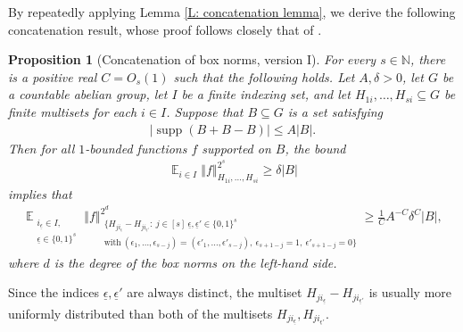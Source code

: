 \documentclass[11pt]{amsart}
\newtheorem{proposition}[lemma]{Proposition}
\theoremstyle{definition}
\DeclareMathOperator*{\E}{\mathbb{E}}
\newcommand{\ueps}{{\underline{\epsilon}}}
\DeclareMathOperator{\supp}{supp}
\newcommand{\norm}[1]{\left\Vert #1\right\Vert}
\begin{document}
By repeatedly applying Lemma \ref{L: concatenation lemma}, we derive the following concatenation result, whose proof follows closely that of \cite[Proposition 2.3]{Kuc23}.
\begin{proposition}[Concatenation of box norms, version I]\label{P: concatenation for general groups}
For every $s\in \mathbb{N}$, there is a positive real $C=O_s(1)$ such that the following holds.     Let $A, \delta>0$,
    let $G$ be a countable abelian group, let $I$ be a finite indexing set, and let $H_{1i}, \ldots, H_{si}\subseteq G$ be finite multisets for each $i\in I$.  Suppose that $B \subseteq G$ is a set
    satisfying 
    \begin{align*}
        |\supp(B+B-B)|\leq A|B|.
    \end{align*}
    Then for all $1$-bounded functions $f$ supported on $B$, the bound
    \begin{align}\label{E: concatenation V1 lower bound}
        {\E_{i\in I}\norm{f}_{H_{1i}, \ldots, H_{si}}^{2^{s}}}\geq \delta |B|
    \end{align}
    implies that
    \begin{align*}
        \E_{\substack{i_\ueps\in I,\\ \ueps\in\{0,1\}^s}}\norm{f}_{\substack{\{H_{j i_\ueps}-H_{j i_{\ueps'}}:\ j\in[s]\ \ueps,\ueps'\in\{0,1\}^s\\ \mathrm{with}\ (\epsilon_1, \ldots,  \epsilon_{s-j}) = (\epsilon'_1, \ldots,  \epsilon'_{s-j}),\ \epsilon_{s+1-j}=1,\ \epsilon'_{s+1-j} = 0\}}}^{2^d} \geq \frac{1}{C} A^{-C} \delta^{C}|B|,
    \end{align*}
    where $d$ is the degree of the box norms on the left-hand side.
\end{proposition}
Since the indices $\ueps,\ueps'$ are always distinct, the multiset $H_{j i_\ueps} - H_{j i_{\ueps'}}$ is usually more uniformly distributed than both of the multisets $H_{j i_\ueps}, H_{j i_{\ueps'}}$.
\end{document}

